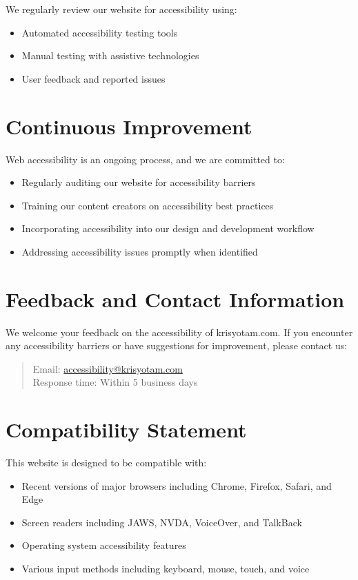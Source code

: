 \documentclass[11pt]{article}
\begin{document}
We regularly review our website for accessibility using:

\begin{itemize}
  \item Automated accessibility testing tools
  \item Manual testing with assistive technologies
  \item User feedback and reported issues
\end{itemize}

\section{Continuous Improvement}

Web accessibility is an ongoing process, and we are committed to:

\begin{itemize}
  \item Regularly auditing our website for accessibility barriers
  \item Training our content creators on accessibility best practices
  \item Incorporating accessibility into our design and development workflow
  \item Addressing accessibility issues promptly when identified
\end{itemize}

\section{Feedback and Contact Information}

We welcome your feedback on the accessibility of krisyotam.com. If you encounter any accessibility barriers or have suggestions for improvement, please contact us:

\begin{quote}
  Email: \href{mailto:accessibility@krisyotam.com}{accessibility@krisyotam.com}\\
  Response time: Within 5 business days
\end{quote}

\section{Compatibility Statement}

This website is designed to be compatible with:

\begin{itemize}
  \item Recent versions of major browsers including Chrome, Firefox, Safari, and Edge
  \item Screen readers including JAWS, NVDA, VoiceOver, and TalkBack
  \item Operating system accessibility features
  \item Various input methods including keyboard, mouse, touch, and voice
\end{itemize}
\end{document}
